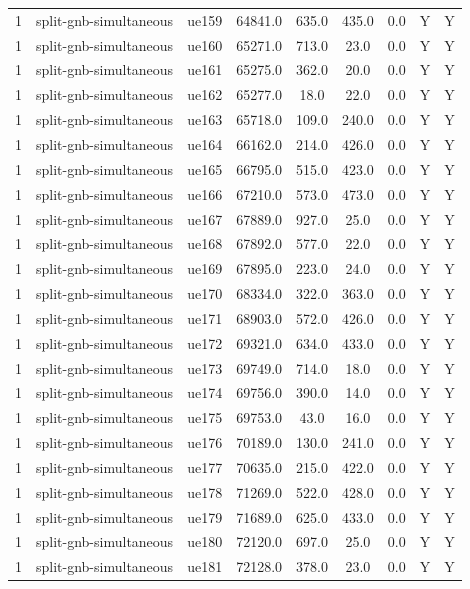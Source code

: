 \begin{table}[ht]
\begin{tabular}{|c|c|c|c|c|c|c|c|c|}
1 & split-gnb-simultaneous & ue159 & 64841.0 & 635.0 & 435.0 & 0.0 & Y & Y \\
1 & split-gnb-simultaneous & ue160 & 65271.0 & 713.0 & 23.0 & 0.0 & Y & Y \\
1 & split-gnb-simultaneous & ue161 & 65275.0 & 362.0 & 20.0 & 0.0 & Y & Y \\
1 & split-gnb-simultaneous & ue162 & 65277.0 & 18.0 & 22.0 & 0.0 & Y & Y \\
1 & split-gnb-simultaneous & ue163 & 65718.0 & 109.0 & 240.0 & 0.0 & Y & Y \\
1 & split-gnb-simultaneous & ue164 & 66162.0 & 214.0 & 426.0 & 0.0 & Y & Y \\
1 & split-gnb-simultaneous & ue165 & 66795.0 & 515.0 & 423.0 & 0.0 & Y & Y \\
1 & split-gnb-simultaneous & ue166 & 67210.0 & 573.0 & 473.0 & 0.0 & Y & Y \\
1 & split-gnb-simultaneous & ue167 & 67889.0 & 927.0 & 25.0 & 0.0 & Y & Y \\
1 & split-gnb-simultaneous & ue168 & 67892.0 & 577.0 & 22.0 & 0.0 & Y & Y \\
1 & split-gnb-simultaneous & ue169 & 67895.0 & 223.0 & 24.0 & 0.0 & Y & Y \\
1 & split-gnb-simultaneous & ue170 & 68334.0 & 322.0 & 363.0 & 0.0 & Y & Y \\
1 & split-gnb-simultaneous & ue171 & 68903.0 & 572.0 & 426.0 & 0.0 & Y & Y \\
1 & split-gnb-simultaneous & ue172 & 69321.0 & 634.0 & 433.0 & 0.0 & Y & Y \\
1 & split-gnb-simultaneous & ue173 & 69749.0 & 714.0 & 18.0 & 0.0 & Y & Y \\
1 & split-gnb-simultaneous & ue174 & 69756.0 & 390.0 & 14.0 & 0.0 & Y & Y \\
1 & split-gnb-simultaneous & ue175 & 69753.0 & 43.0 & 16.0 & 0.0 & Y & Y \\
1 & split-gnb-simultaneous & ue176 & 70189.0 & 130.0 & 241.0 & 0.0 & Y & Y \\
1 & split-gnb-simultaneous & ue177 & 70635.0 & 215.0 & 422.0 & 0.0 & Y & Y \\
1 & split-gnb-simultaneous & ue178 & 71269.0 & 522.0 & 428.0 & 0.0 & Y & Y \\
1 & split-gnb-simultaneous & ue179 & 71689.0 & 625.0 & 433.0 & 0.0 & Y & Y \\
1 & split-gnb-simultaneous & ue180 & 72120.0 & 697.0 & 25.0 & 0.0 & Y & Y \\
1 & split-gnb-simultaneous & ue181 & 72128.0 & 378.0 & 23.0 & 0.0 & Y & Y \\

\end{tabular}
\end{table}

